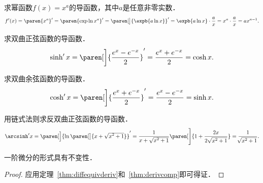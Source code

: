 \begin{example*}
  求幂函数\(f(x) = x^a\)的导函数，其中\(a\)是任意非零实数．
  \begin{equation*}
    f'(x)
    = \paren{x^a}'
    = \paren{\exp\ln x^a}'
    = \paren[\big]{\expb{a \ln x}}'
    = \expb{a \ln x} \cdot \frac{a}{x}
    = x^a \cdot \frac ax
    = ax^{a-1}.
  \end{equation*}
\end{example*}

\begin{example*}
  求双曲正弦函数的导函数．
  \begin{equation*}
    \sinh' x
    = \paren[\bigg]{\frac{e^x - e^{-x}}{2}}'
    = \frac{e^x + e^{-x}}{2}
    = \cosh x.
  \end{equation*}
\end{example*}

\begin{example*}
  求双曲余弦函数的导函数．
  \begin{equation*}
    \cosh' x
    = \paren[\bigg]{\frac{e^x+e^{-x}}{2}}'
    = \frac{e^x - e^{-x}}{2}
    = \sinh x.
  \end{equation*}
\end{example*}

\begin{example*}
  用链式法则求反双曲正弦函数的导函数．
  \begin{equation*}
    \arcsinh' x
    = \paren[\Big]{\ln\paren[\big]{x + \sqrt{\smash{x^2} + 1}}}'
    = \frac{1}{x + \sqrt{\smash{x^2} + 1}} \paren[\Bigg]{1 + \frac{2x}{2\sqrt{x^2 + 1}}}
    = \frac{1}{\negthickspace\sqrt{x^2 + 1}}.
  \end{equation*}
\end{example*}

\begin{theorem*}[一阶微分形式的不变性]
  一阶微分的形式具有不变性．

  \begin{proof}
    应用定理~\ref{thm:diffequivderiv}和~\ref{thm:derivcomp}即可得证．
  \end{proof}
\end{theorem*}

